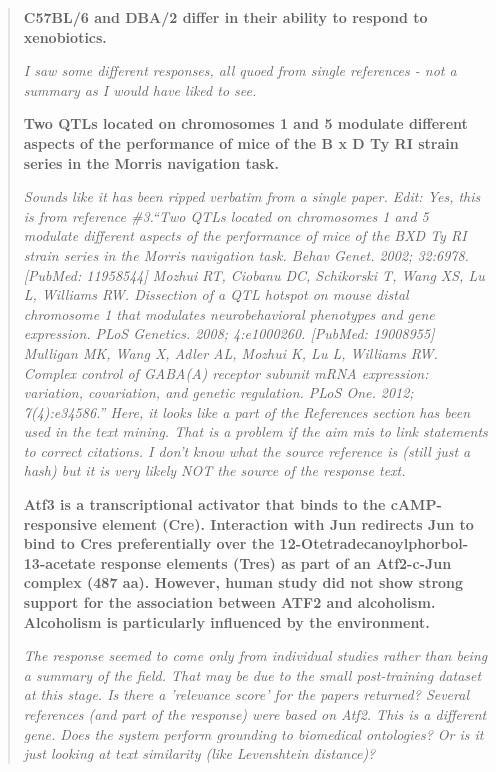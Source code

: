 \begin{quotation}

\textbf{C57BL/6 and DBA/2 differ in their ability to respond to xenobiotics.} 

\textit{I saw some different responses, all quoed from single references - not a summary as I would have liked to see.}
    

\textbf{Two QTLs located on chromosomes 1 and 5 modulate different aspects of the performance of mice of the B x D Ty RI strain series in the Morris navigation task.} 

\textit{Sounds like it has been ripped verbatim from a single paper. Edit: Yes, this is from reference \#3.“Two QTLs located on chromosomes 1 and 5 modulate different aspects of the performance of mice of the BXD Ty RI strain series in the Morris navigation task. Behav Genet. 2002; 32:6978. [PubMed: 11958544] Mozhui RT, Ciobanu DC, Schikorski T, Wang XS, Lu L, Williams RW. Dissection of a QTL hotspot on mouse distal chromosome 1 that modulates neurobehavioral phenotypes and gene expression. PLoS Genetics. 2008; 4:e1000260. [PubMed: 19008955] Mulligan MK, Wang X, Adler AL, Mozhui K, Lu L, Williams RW. Complex control of GABA(A) receptor subunit mRNA expression: variation, covariation, and genetic regulation. PLoS One. 2012; 7(4):e34586.” Here, it looks like a part of the References section has been used in the text mining. That is a problem if the aim mis to link statements to correct citations. I don’t know what the source reference is (still just a hash) but it is very likely NOT the source of the response text.}


\textbf{Atf3 is a transcriptional activator that binds to the cAMP-responsive element (Cre). Interaction with Jun redirects Jun to bind to Cres preferentially over the 12-Otetradecanoylphorbol-13-acetate response elements (Tres) as part of an Atf2-c-Jun complex (487 aa). However, human study did not show strong support for the association between ATF2 and alcoholism. Alcoholism is particularly influenced by the environment.}

\textit{The response seemed to come only from individual studies rather than being a summary of the field. That may be due to the small post-training dataset at this stage. Is there a 'relevance score' for the papers returned? Several references (and part of the response) were based on Atf2. This is a different gene. Does the system perform grounding to biomedical ontologies? Or is it just looking at text similarity (like Levenshtein distance)?}
\end{quotation}



